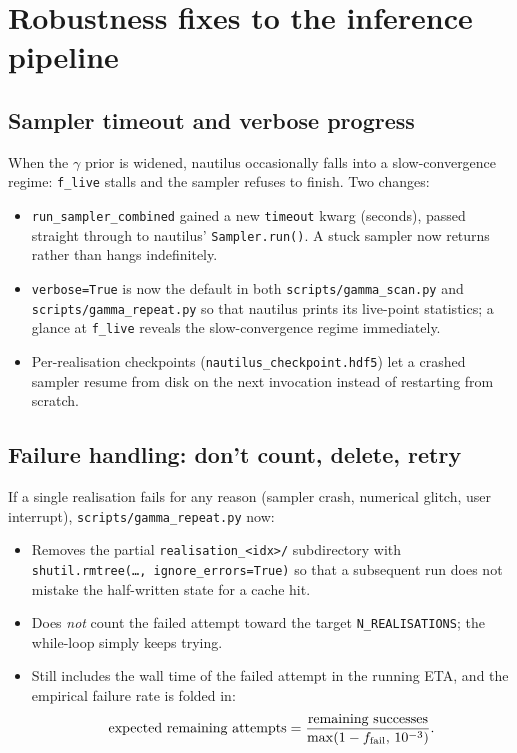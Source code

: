\documentclass[11pt,a4paper]{article}
\begin{document}
\section{Robustness fixes to the inference pipeline}

\subsection{Sampler timeout and verbose progress}

When the $\gamma$ prior is widened, nautilus occasionally falls into a
slow-convergence regime: \texttt{f\_live} stalls and the sampler refuses to
finish.  Two changes:

\begin{itemize}[noitemsep]
  \item \texttt{run\_sampler\_combined} gained a new \texttt{timeout}
        kwarg (seconds), passed straight through to nautilus'
        \texttt{Sampler.run()}.  A stuck sampler now returns rather than
        hangs indefinitely.
  \item \texttt{verbose=True} is now the default in both
        \texttt{scripts/gamma\_scan.py} and \texttt{scripts/gamma\_repeat.py}
        so that nautilus prints its live-point statistics; a glance at
        \texttt{f\_live} reveals the slow-convergence regime immediately.
  \item Per-realisation checkpoints (\texttt{nautilus\_checkpoint.hdf5})
        let a crashed sampler resume from disk on the next invocation
        instead of restarting from scratch.
\end{itemize}

\subsection{Failure handling: don't count, delete, retry}

If a single realisation fails for any reason (sampler crash, numerical
glitch, user interrupt), \texttt{scripts/gamma\_repeat.py} now:

\begin{itemize}[noitemsep]
  \item Removes the partial \texttt{realisation\_<idx>/} subdirectory with
        \texttt{shutil.rmtree(\ldots,~ignore\_errors=True)} so that a
        subsequent run does not mistake the half-written state for a cache
        hit.
  \item Does \emph{not} count the failed attempt toward the target
        \texttt{N\_REALISATIONS}; the while-loop simply keeps trying.
  \item Still includes the wall time of the failed attempt in the running
        ETA, and the empirical failure rate is folded in:
        \[
          \text{expected remaining attempts} =
          \frac{\text{remaining successes}}{\max(1-f_{\rm fail},\,10^{-3})}.
        \]
\end{itemize}
\end{document}
